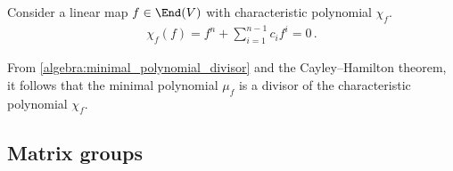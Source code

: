     \begin{theorem}\label{linalgebra:cayley_hamilton}
        Consider a linear map $f\in\End(V)$ with characteristic polynomial $\chi_f$.
        \begin{gather}
            \chi_f(f) = f^n + \sum_{i=1}^{n-1}c_if^i=0\,.
        \end{gather}
    \end{theorem}
    \begin{result}
        From \cref{algebra:minimal_polynomial_divisor} and the Cayley--Hamilton theorem, it follows that the minimal polynomial $\mu_f$ is a divisor of the characteristic polynomial $\chi_f$.
    \end{result}

\subsection{Matrix groups}\label{section:linear_groups}

